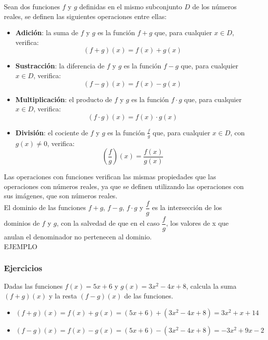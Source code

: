 
Sean dos funciones $f$ y $g$ definidas en el mismo subconjunto $D$ de los números reales, se definen las siguientes operaciones entre ellas:
\begin{itemize}
	\item \textbf{Adición}: la suma de $f$ y $g$ es la función $f+g$ que, para cualquier $x \in D$, verifica:
	$$(f+g)(x) = f(x)+g(x)$$
	\item \textbf{Sustracción}: la diferencia de $f$ y $g$ es la función $f-g$ que, para cualquier $x \in D$, verifica:
	$$(f-g)(x) = f(x)-g(x)$$
	\item \textbf{Multiplicación}: el producto de $f$ y $g$ es la función $f \cdot g$ que, para cualquier $x \in D$, verifica:
	$$(f \cdot g)(x) = f(x) \cdot g(x)$$
	\item \textbf{División}: el cociente de $f$ y $g$ es la función $\frac{f}{g}$ que, para cualquier $x \in D$, con $g(x) \neq 0$, verifica:
	$$(\dfrac{f}{g})(x) = \dfrac{f(x)}{g(x)}$$
\end{itemize}
Las operaciones con funciones verifican las mismas propiedades que las operaciones con números reales, ya que se definen utilizando las operaciones con sus imágenes, que son números reales.\\
El dominio de las funciones $f+g$, $f-g$, $f \cdot g$ y $\dfrac{f}{g}$ es la intersección de los dominios de $f$ y $g$, con la salvedad de que en el caso $\dfrac{f}{g}$, los valores de x que anulan el denominador no pertenecen al dominio.\\

EJEMPLO

\subsubsection{Ejercicios}

\begin{ex}
	Dadas las funciones $f(x)=5x+6$ y $g(x)=3x^2-4x+8$, calcula la suma $(f+g)(x)$ y la resta $(f-g)(x)$ de las funciones.
	\begin{sol}
		\begin{itemize}
			\item $(f+g)(x) = f(x)+g(x) = (5x+6)+(3x^2-4x+8) = 3x^2+x+14$
			\item $(f-g)(x) = f(x)-g(x) = (5x+6)-(3x^2-4x+8) = -3x^2+9x-2$
		\end{itemize}
	\end{sol}
\end{ex}

\vspace{1cm}

